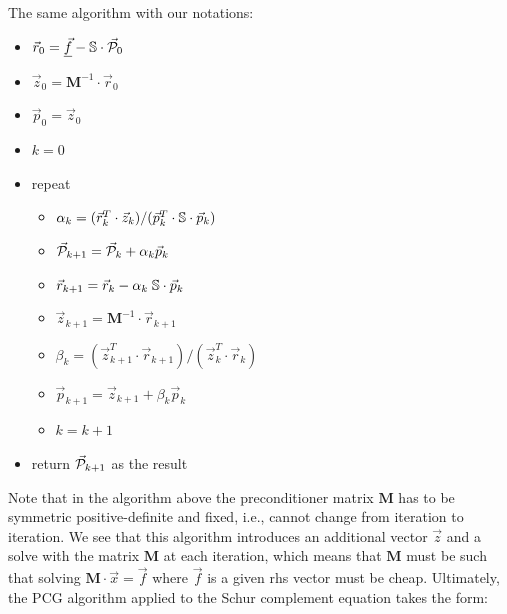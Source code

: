 The same algorithm with our notations:
\begin{itemize}
\item $\vec{r}_0 = \underline{\vec{f}} - {\mathbb{S}} \cdot \vec{\cal P}_0$ 
\item $\vec{z}_0= {\bm M}^{-1} \cdot \vec{r}_0$ 
\item $\vec{p}_0 = \vec{z}_0$
\item $k=0$ 
\item repeat
\begin{itemize}
\item $\alpha_k = (\vec{r}_k^T\cdot \vec{z}_k )/(\vec{p}_k^T \cdot {\mathbb{S}}\cdot  \vec{p}_k )$
\item $\vec{\cal P}_{k+1} = \vec{\cal P}_k+\alpha_k \vec{p}_k$
\item $\vec{r}_{k+1} = \vec{r}_k - \alpha_k \; {\mathbb{S}} \cdot \vec{p}_k $ 
\item $\vec{z}_{k+1} = {\bm M}^{-1} \cdot \vec{r}_{k+1}$ 
\item $\beta_k=(\vec{z}_{k+1}^T \cdot \vec{r}_{k+1})/(\vec{z}_k^T \cdot \vec{r}_k)$ 
\item $\vec{p}_{k+1} =\vec{z}_{k+1}+ \beta_k \vec{p}_k$ 
\item $k=k+1$ 
\end{itemize}
\item return $\vec{\cal P}_{k+1}$ as the result
\end{itemize}



Note that in the algorithm above the preconditioner matrix ${\bm M}$ 
has to be symmetric positive-definite and fixed, i.e., cannot change from iteration to iteration. 
We see that this algorithm introduces an additional vector $\vec{z}$ and a solve with the 
matrix ${\bm M}$ at each iteration, which means that ${\bm M}$ must 
be such that solving ${\bm M}\cdot \vec{x}= \vec{f}$ 
where $\vec{f}$ is a given rhs vector must be cheap. Ultimately, the PCG algorithm applied to 
the Schur complement equation takes the form:

